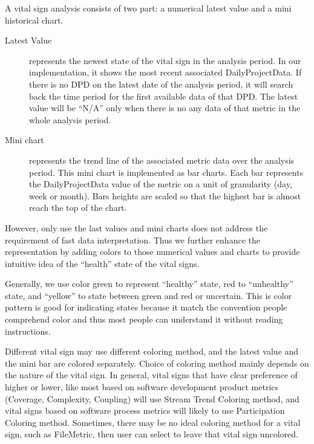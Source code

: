 A vital sign analysis consists of two part: a numerical latest value and a mini historical chart. 
\begin{description}
\item[Latest Value] represents the newest state of the vital sign in the analysis period. In our implementation, it shows the most recent associated DailyProjectData. If there is no DPD on the latest date of the analysis period, it will search back the time period for the first available data of that DPD. The latest value will be ``N/A'' only when there is no any data of that metric in the whole analysis period.
\item[Mini chart] represents the trend line of the associated metric data over the analysis period. This mini chart is implemented as bar charts. Each bar represents the DailyProjectData value of the metric on a unit of granularity (day, week or month). Bars heights are scaled so that the highest bar is almost reach the top of the chart.
\end{description}

However, only use the last values and mini charts does not address the requirement of fast data interpretation. Thus we further enhance the representation by adding colors to those numerical values and charts to provide intuitive idea of the ``health'' state of the vital signs.

Generally, we use color green to represent ``healthy'' state, red to ``unhealthy'' state, and ``yellow'' to state between green and red or uncertain. This is color pattern is good for indicating states because it match the convention people comprehend color and thus most people can understand it without reading instructions.

Different vital sign may use different coloring method, and the latest value and the mini bar are colored separately. Choice of coloring method mainly depends on the nature of the vital sign. In general, vital signs that have clear preference of higher or lower, like most based on software development product metrics (Coverage, Complexity, Coupling) will use Stream Trend Coloring method, and vital signs based on software process metrics will likely to use Participation Coloring method. Sometimes, there may be no ideal coloring method for a vital sign, such as FileMetric, then user can select to leave that vital sign uncolored.


